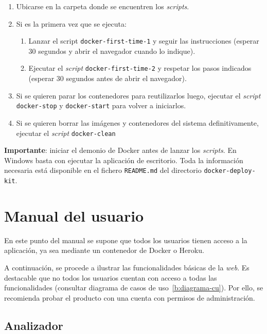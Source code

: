 \begin{enumerate}
	\item Ubicarse en la carpeta donde se encuentren los \textit{scripts}.
	\item Si es la primera vez que se ejecuta:
	\begin{enumerate}
	\item Lanzar el script \texttt{docker-first-time-1} y seguir las instrucciones (esperar 30 segundos y abrir el navegador cuando lo indique).
	\item Ejecutar el \textit{script} \texttt{docker-first-time-2} y respetar los pasos indicados (esperar 30 segundos antes de abrir el navegador).
	\end{enumerate}
	\item Si se quieren parar los contenedores para reutilizarlos luego, ejecutar el \textit{script} \texttt{docker-stop} y \texttt{docker-start} para volver a iniciarlos.
	\item Si se quieren borrar las imágenes y contenedores del sistema definitivamente, ejecutar el \textit{script} \texttt{docker-clean}
\end{enumerate}

\textbf{Importante}: iniciar el demonio de Docker antes de lanzar los \textit{scripts}. En Windows basta con ejecutar la aplicación de escritorio. Toda la información necesaria está disponible en el fichero \texttt{README.md} del directorio \texttt{docker-deploy-kit}.

\section{Manual del usuario}

En este punto del manual se supone que todos los usuarios tienen acceso a la aplicación, ya sea mediante un contenedor de Docker o Heroku.

A continuación, se procede a ilustrar las funcionalidades básicas de la \textit{web}. Es destacable que no todos los usuarios cuentan con acceso a todas las funcionalidades (consultar diagrama de casos de uso~\ref{b:diagrama-cu}). Por ello, se recomienda probar el producto con una cuenta con permisos de administración.


\subsection{Analizador}
\label{s-e:analizador}

